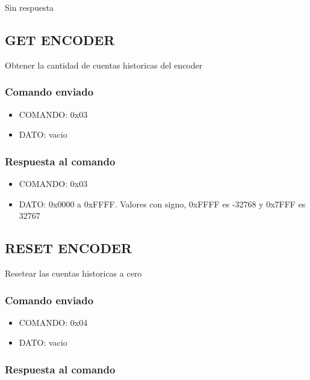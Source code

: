 \documentclass[a4paper,11pt]{article}
\begin{document}
Sin respuesta

\subsection{GET ENCODER}
\label{get_encoder}

Obtener la cantidad de cuentas historicas del encoder

\subsubsection*{Comando enviado}
\label{get_encoder_comando_enviado}

\begin{itemize}
	\item{COMANDO:} 0x03
	\item{DATO:} vacio
\end{itemize}

\subsubsection*{Respuesta al comando}
\label{get_encoder_respuesta}

\begin{itemize}
	\item{COMANDO:} 0x03
	\item{DATO:} 0x0000 a 0xFFFF. Valores con signo, 0xFFFF es -32768 y 0x7FFF es 32767
\end{itemize}

\subsection{RESET ENCODER}
\label{reset_encoder}

Resetear las cuentas historicas a cero

\subsubsection*{Comando enviado}
\label{reset_encoder_comando_enviado}

\begin{itemize}
	\item{COMANDO:} 0x04
	\item{DATO:} vacio
\end{itemize}

\subsubsection*{Respuesta al comando}
\label{reset_encoder_respuesta}
\end{document}
